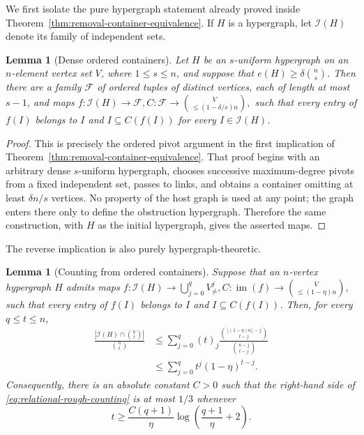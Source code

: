 \documentclass[11pt,reqno,letterpaper]{amsart}
\newcommand{\cI}{{\mathcal I}}
\newcommand{\cF}{{\mathcal F}}
\theoremstyle{plain}
\newtheorem{lem}[thm]{Lemma}
\theoremstyle{remark}
\begin{document}
We first isolate the pure hypergraph statement already proved inside
Theorem~\ref{thm:removal-container-equivalence}.  If $H$ is a hypergraph, let
$\cI(H)$ denote its family of independent sets.

\begin{lem}[Dense ordered containers]
\label{lem:dense-ordered-containers}
Let $H$ be an $s$-uniform hypergraph on an $n$-element vertex set $V$, where
$1\leq s\leq n$, and suppose that
\(e(H)\geq\delta\binom{n}{s}\).
Then there are a family $\cF$ of ordered tuples of distinct vertices, each of
length at most $s-1$, and maps
\(f:\cI(H)\to\cF,  C:\cF\to\binom{V}{\leq(1-\delta/s)n},\)
such that every entry of $f(I)$ belongs to $I$ and
\(I\subseteq C(f(I))\)
for every $I\in\cI(H)$.
\end{lem}

\begin{proof}
This is precisely the ordered pivot argument in the first implication of
Theorem~\ref{thm:removal-container-equivalence}.  That proof begins with an
arbitrary dense $s$-uniform hypergraph, chooses successive maximum-degree
pivots from a fixed independent set, passes to links, and obtains a container
omitting at least $\delta n/s$ vertices.  No property of the host graph is used
at any point; the graph enters there only to define the obstruction
hypergraph.  Therefore the same construction, with $H$ as the initial
hypergraph, gives the asserted maps.
\end{proof}

The reverse implication is also purely hypergraph-theoretic.

\begin{lem}[Counting from ordered containers]
\label{lem:counting-from-containers}
Suppose that an $n$-vertex hypergraph $H$ admits maps
\(f:\cI(H)\to\bigcup_{j=0}^{q}V_{\neq}^{j}, C:\operatorname{im}(f)\to\binom{V}{\leq(1-\eta)n},\)
such that every entry of $f(I)$ belongs to $I$ and
$I\subseteq C(f(I))$.  Then, for every $q\leq t\leq n$,
\begin{align}
\frac{|\cI(H)\cap\binom{V}{t}|}{\binom{n}{t}}
&\leq
\sum_{j=0}^{q}(t)_j
\frac{\binom{\lfloor(1-\eta)n\rfloor-j}{t-j}}
{\binom{n-j}{t-j}}                                      \label{eq:relational-exact-counting}\\
&\leq\sum_{j=0}^{q}t^j(1-\eta)^{t-j}.                       \label{eq:relational-rough-counting}
\end{align}
Consequently, there is an absolute constant $C>0$ such that the right-hand
side of \eqref{eq:relational-rough-counting} is at most $1/3$ whenever
\begin{equation}
\label{eq:relational-sampling-threshold}
t\geq
\frac{C(q+1)}{\eta}
\log\left(\frac{q+1}{\eta}+2\right).
\end{equation}
\end{lem}
\end{document}
